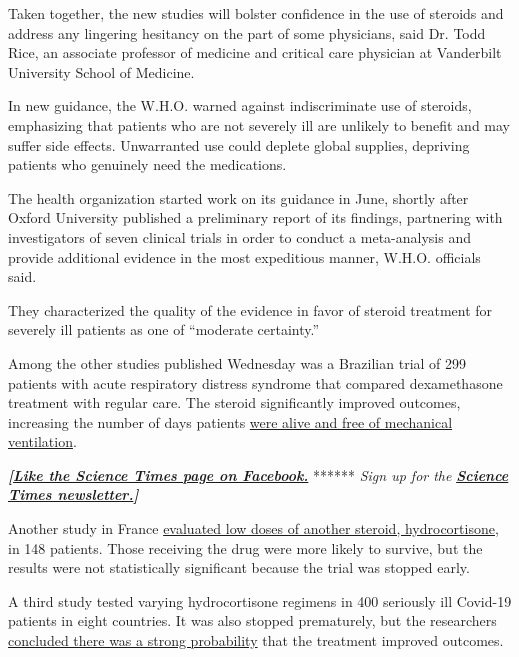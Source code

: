 Taken together, the new studies will bolster confidence in the use of
steroids and address any lingering hesitancy on the part of some
physicians, said Dr. Todd Rice, an associate professor of medicine and
critical care physician at Vanderbilt University School of Medicine.

In new guidance, the W.H.O. warned against indiscriminate use of
steroids, emphasizing that patients who are not severely ill are
unlikely to benefit and may suffer side effects. Unwarranted use could
deplete global supplies, depriving patients who genuinely need the
medications.

The health organization started work on its guidance in June, shortly
after Oxford University published a preliminary report of its findings,
partnering with investigators of seven clinical trials in order to
conduct a meta-analysis and provide additional evidence in the most
expeditious manner, W.H.O. officials said.

They characterized the quality of the evidence in favor of steroid
treatment for severely ill patients as one of ``moderate certainty.''

Among the other studies published Wednesday was a Brazilian trial of 299
patients with acute respiratory distress syndrome that compared
dexamethasone treatment with regular care. The steroid significantly
improved outcomes, increasing the number of days patients
\href{https://jamanetwork.com/journals/jama/fullarticle/10.1001/jama.2020.17021}{were
alive and free of mechanical ventilation}.

\textbf{\emph{{[}}\href{http://on.fb.me/1paTQ1h}{\emph{Like the Science
Times page on Facebook.}}} ****** \emph{\textbar{} Sign up for the}
\textbf{\href{http://nyti.ms/1MbHaRU}{\emph{Science Times
newsletter.}}\emph{{]}}}

Another study in France
\href{https://jamanetwork.com/journals/jama/fullarticle/10.1001/jama.2020.16761}{evaluated
low doses of another steroid, hydrocortisone}, in 148 patients. Those
receiving the drug were more likely to survive, but the results were not
statistically significant because the trial was stopped early.

A third study tested varying hydrocortisone regimens in 400 seriously
ill Covid-19 patients in eight countries. It was also stopped
prematurely, but the researchers
\href{https://jamanetwork.com/journals/jama/fullarticle/10.1001/jama.2020.17022}{concluded
there was a strong probability} that the treatment improved outcomes.

